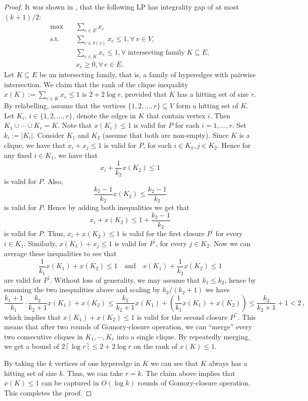 \documentclass[11pt]{article}
\newcommand{\ceil}[1]{\left\lceil #1 \right\rceil}
\theoremstyle{remark}
\begin{document}
\begin{proof}
    It was shown in \cite{cl12}, that the following LP has integrality gap of at most $(k+1)/2$:
    \begin{align*}
      \max & \quad \sum_{e\in E} x_e \\
      \text{s.t.}
      & \quad \sum_{e\in\delta(v)} x_e \leq 1, \forall \, v\in V, \\
      & \quad \sum_{e\in K} x_e \leq 1, \forall\;\text{intersecting family}\; K\subseteq E, \\
      & \quad x_e \geq 0, \forall \, e\in E.
    \end{align*}
    Let $K \subseteq E$ be an intersecting family, that is, a family of hyperedges with pairwise intersection.
    We claim that the rank of the clique inequality $x(K):=\sum_{e\in K} x_e\leq 1$ is $2+2\log r$, provided that $K$ has a hitting set of size $r$.
	By relabelling, assume that the vertices $\{1,2,\dotsc,r\} \subseteq V$ form a hitting set of $K$. Let $K_i$, $i\in\{1,2,\dotsc,r\}$, denote the edges in $K$ that contain vertex $i$.
	Then $K_1\cup \cdots\cup K_r = K$. Note that $x(K_i)\leq 1$ is valid for $P$ for each $i = 1,\dots, r$. Set $k_i := |K_i|$.
    Consider $K_1$ and $K_2$ (assume that both are non-empty). Since $K$ is a clique, we have that $x_i + x_j\leq 1$ is valid for $P$, for each $i \in K_1, j \in K_2$. 
    Hence for any fixed $i \in K_1$, we have that 
    \[x_i + \frac{1}{k_2} x(K_2) \leq 1\] 
    is valid for $P$. Also, 
    \[\frac{k_2-1}{k_2} x(K_2) \leq \frac{k_2-1}{k_2}\] 
    is valid for $P$. Hence by adding both inequalities we get that 
    \[x_i + x(K_2) \leq 1 + \frac{k_2-1}{k_2}\] 
    is valid for $P$. Thus, $x_i + x(K_2) \leq 1$ is valid for the first closure $P^\prime$ for every $i \in K_1$. 
    Similarly, $x(K_1) + x_j \leq 1$ is valid for $P^\prime$, for every $j \in K_2$. 
    Now we can average these inequalities to see that 
    \begin{equation*}
        \frac{1}{k_1} x(K_1) + x(K_2) \leq 1\quad \text{and} \quad x(K_1) + \frac{1}{k_2} x(K_2) \leq 1
    \end{equation*} 
    are valid for $P^\prime$. Without loss of generality, we may assume that $k_1\leq k_2$, hence by summing the two inequalities above and scaling by $k_2/(k_2+1)$ we have
    \[
	    \frac{k_1+1}{k_1}\cdot \frac{k_2}{k_2+1} x(K_1) + x(K_2) \le \frac{k_2}{k_2+1} x(K_1) + \left(\frac{1}{k_1} x(K_1) + x(K_2)\right) \leq \frac{k_2}{k_2+1} + 1 < 2 \, ,
    \]
    which implies that $x(K_1) + x(K_2) \leq 1$ is valid for the second closure $P^{\prime\prime}$.
    This means that after two rounds of Gomory-closure operation, we can ``merge'' every two consecutive cliques in $K_1, \cdots, K_r$ into a single clique. 
    By repeatedly merging, we get a bound of $2 \ceil{\log r} \leq 2+2\log r$ on the rank of $x(K) \leq 1$.

    By taking the $k$ vertices of one hyperedge in $K$ we can see that $K$ always has a hitting set of size $k$.
	Thus, we can take $r=k$. The claim above implies that $x(K)\leq 1$ can be captured in $O(\log k)$ rounds of Gomory-closure operation. This completes the proof.
      \end{proof}
\end{document}
